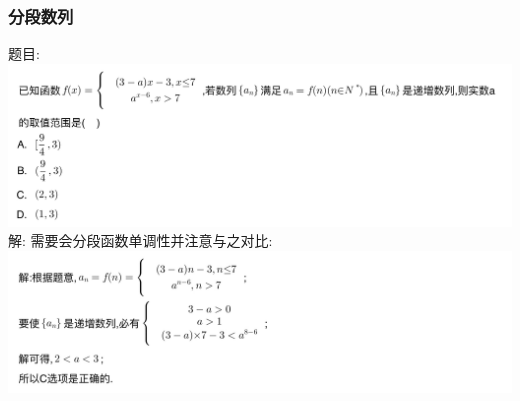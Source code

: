 \documentclass[hyperref, UTF8,11pt,a4paper]{ctexart} %
\begin{document}

\subsubsection{分段数列}
{\color{red}  题目: } \\
\includegraphics[width=500pt]  {pic/shulie/fenduanhanshutimu.jpg} \\
解: {\color{blue} 需要会分段函数单调性并注意与之对比: }\\
\includegraphics[width=500pt]  {pic/shulie/fenduanhanshudaan.jpg} \\

\end{document}
